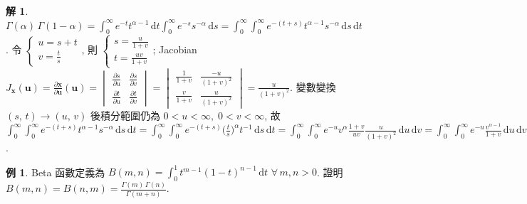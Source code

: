 \documentclass[12pt]{extarticle}
\newcommand{\ds}{\displaystyle}
\theoremstyle{definition}
\newtheorem*{ex}{例}
\newtheorem*{sol}{解}
\newcommand{\vu}{\mathbf{u}}
\newcommand{\vx}{\mathbf{x}}
\begin{document}
\begin{sol}
  $\ds\Gamma(\alpha)\,\Gamma(1 - \alpha) = \int_0^\infty\!\!e^{-t}t^{\alpha - 1}\,\text{d}t\int_0^\infty\!\!e^{-s}s^{-\alpha}\,\text{d}s = \int_0^\infty\!\!\!\int_0^\infty\!\!e^{-(t + s)}t^{\alpha - 1}s^{-\alpha}\,\text{d}s\,\text{d}t$. 令 $\ds\begin{cases}u = s + t \\ v = \frac{t}{s}\end{cases}\!\!\!\!\!$, 則 $\ds\begin{cases}s = \frac{u}{1 + v}\\ t = \frac{uv}{1 + v}\end{cases}\!\!\!\!\!$; Jacobian $\ds J_{\vx}(\vu) = \frac{\partial\vx}{\partial\vu}(\vu) = \begin{vmatrix}\frac{\partial s}{\partial u} & \frac{\partial s}{\partial v} \\ \frac{\partial t}{\partial u}& \frac{\partial t}{\partial v}\end{vmatrix} = \begin{vmatrix}\frac{1}{1 + v} & \frac{-u}{(1 + v)^2} \\ \frac{v}{1 + v} & \frac{u}{(1 + v)^2}\end{vmatrix} = \frac{u}{(1 + v)^2}$. 變數變換 $(s,\,t)\to(u,\,v)$ 後積分範圍仍為 $0< u < \infty,\;0 < v < \infty$, 故 $\ds\int_0^\infty\!\!\!\int_0^\infty e^{-(t + s)}t^{\alpha - 1}s^{-\alpha}\,\text{d}s\,\text{d}t = \int_0^\infty\!\!\!\int_0^\infty e^{-(t + s)}\Big(\frac{t}{s}\Big)^{\alpha}t^{-1}\,\text{d}s\,\text{d}t = \int_0^\infty\!\!\!\int_0^\infty e^{-u}v^{\alpha}\frac{1 + v}{u v}\frac{u}{(1 + v)^2}\,\text{d}u\,\text{d}v = \int_0^\infty\!\!\!\int_0^\infty\!\! e^{-u}\frac{v^{\alpha - 1}}{1 + v}\,\text{d}u\,\text{d}v = \int_0^\infty\!\!e^{-u}\,\text{d}u\int_0^\infty\!\frac{v^{\alpha - 1}}{1 + v}\,\text{d}v = \int_0^\infty\!\frac{v^{\alpha - 1}}{1 + v}\,\text{d}v = \frac{\pi}{\sin\alpha\pi}$.
\end{sol}

\begin{ex}
  Beta 函數定義為 $\ds B(m, n) = \int_0^1 t^{m - 1}(1 - t)^{n - 1}\,\mathrm{d}t$ $\forall\,m, n > 0$. 證明 $\ds B(m, n) = B(n, m) = \frac{\Gamma(m)\,\Gamma(n)}{\Gamma(m + n)}$.
\end{ex}
\end{document}

